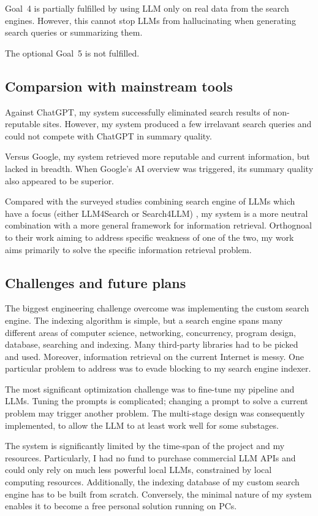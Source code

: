 \documentclass[final-report]{report-template}
\begin{document}
Goal~4 is partially fulfilled by using LLM only on real data from the search
engines. However, this cannot stop LLMs from hallucinating when generating
search queries or summarizing them.

The optional Goal~5 is not fulfilled.

\subsection{Comparsion with mainstream tools}
Against ChatGPT, my system successfully eliminated search results of
non-reputable sites. However, my system produced a few irrelavant search
queries and could not compete with ChatGPT in summary quality.

Versus Google, my system retrieved more reputable and current
information, but lacked in breadth. When Google's AI overview was triggered,
its summary quality also appeared to be superior.

Compared with the surveyed studies combining search engine of LLMs which have a
focus (either LLM4Search or Search4LLM) \cite{llm.meet.search.1}, my system is
a more neutral combination with a more general framework for information
retrieval. Orthognoal to their work aiming to address specific weakness of one
of the two, my work aims primarily to solve the specific information retrieval
problem.

\subsection{Challenges and future plans}
The biggest engineering challenge overcome was implementing the custom search
engine. The indexing algorithm is simple, but a search engine spans
many different areas of computer science, networking, concurrency, program
design, database, searching and indexing. Many third-party libraries had to be
picked and used. Moreover, information retrieval on the current Internet is
messy. One particular problem to address was to evade blocking to my search
engine indexer.

The most significant optimization challenge was to fine-tune my pipeline and
LLMs. Tuning the prompts is complicated; changing a prompt to solve a current
problem may trigger another problem. The multi-stage design was consequently
implemented, to allow the LLM to at least work well for some substages.

The system is significantly limited by the time-span of the project and my
resources. Particularly, I had no fund to purchase commercial LLM APIs and
could only rely on much less powerful local LLMs, constrained by local
computing resources. Additionally, the indexing database of my custom search
engine has to be built from scratch. Conversely, the minimal nature of my
system enables it to become a free personal solution running on PCs.
\end{document}
